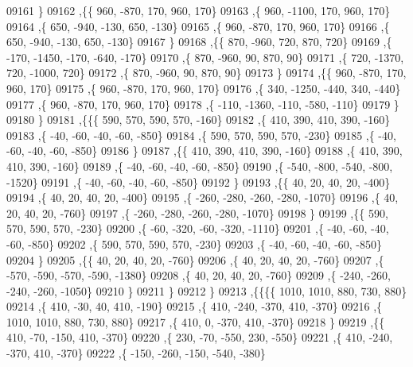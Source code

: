 \begin{DoxyCode}
09161     \}
09162    ,\{\{   960,  -870,   170,   960,   170\}
09163     ,\{   960, -1100,   170,   960,   170\}
09164     ,\{   650,  -940,  -130,   650,  -130\}
09165     ,\{   960,  -870,   170,   960,   170\}
09166     ,\{   650,  -940,  -130,   650,  -130\}
09167     \}
09168    ,\{\{   870,  -960,   720,   870,   720\}
09169     ,\{  -170, -1450,  -170,  -640,  -170\}
09170     ,\{   870,  -960,    90,   870,    90\}
09171     ,\{   720, -1370,   720, -1000,   720\}
09172     ,\{   870,  -960,    90,   870,    90\}
09173     \}
09174    ,\{\{   960,  -870,   170,   960,   170\}
09175     ,\{   960,  -870,   170,   960,   170\}
09176     ,\{   340, -1250,  -440,   340,  -440\}
09177     ,\{   960,  -870,   170,   960,   170\}
09178     ,\{  -110, -1360,  -110,  -580,  -110\}
09179     \}
09180    \}
09181   ,\{\{\{   590,   570,   590,   570,  -160\}
09182     ,\{   410,   390,   410,   390,  -160\}
09183     ,\{   -40,   -60,   -40,   -60,  -850\}
09184     ,\{   590,   570,   590,   570,  -230\}
09185     ,\{   -40,   -60,   -40,   -60,  -850\}
09186     \}
09187    ,\{\{   410,   390,   410,   390,  -160\}
09188     ,\{   410,   390,   410,   390,  -160\}
09189     ,\{   -40,   -60,   -40,   -60,  -850\}
09190     ,\{  -540,  -800,  -540,  -800, -1520\}
09191     ,\{   -40,   -60,   -40,   -60,  -850\}
09192     \}
09193    ,\{\{    40,    20,    40,    20,  -400\}
09194     ,\{    40,    20,    40,    20,  -400\}
09195     ,\{  -260,  -280,  -260,  -280, -1070\}
09196     ,\{    40,    20,    40,    20,  -760\}
09197     ,\{  -260,  -280,  -260,  -280, -1070\}
09198     \}
09199    ,\{\{   590,   570,   590,   570,  -230\}
09200     ,\{   -60,  -320,   -60,  -320, -1110\}
09201     ,\{   -40,   -60,   -40,   -60,  -850\}
09202     ,\{   590,   570,   590,   570,  -230\}
09203     ,\{   -40,   -60,   -40,   -60,  -850\}
09204     \}
09205    ,\{\{    40,    20,    40,    20,  -760\}
09206     ,\{    40,    20,    40,    20,  -760\}
09207     ,\{  -570,  -590,  -570,  -590, -1380\}
09208     ,\{    40,    20,    40,    20,  -760\}
09209     ,\{  -240,  -260,  -240,  -260, -1050\}
09210     \}
09211    \}
09212   \}
09213  ,\{\{\{\{  1010,  1010,   880,   730,   880\}
09214     ,\{   410,   -30,    40,   410,  -190\}
09215     ,\{   410,  -240,  -370,   410,  -370\}
09216     ,\{  1010,  1010,   880,   730,   880\}
09217     ,\{   410,     0,  -370,   410,  -370\}
09218     \}
09219    ,\{\{   410,   -70,  -150,   410,  -370\}
09220     ,\{   230,   -70,  -550,   230,  -550\}
09221     ,\{   410,  -240,  -370,   410,  -370\}
09222     ,\{  -150,  -260,  -150,  -540,  -380\}

\end{DoxyCode}
